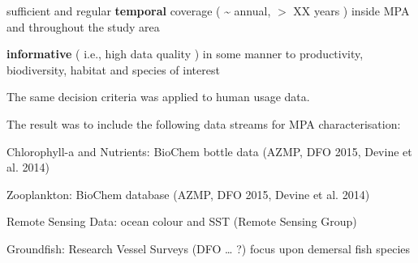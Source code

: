 \documentclass[letterpaper,portrait,12pt]{scrartcl}
\numberwithin{equation}{section}		%
\numberwithin{figure}{section}			%
\numberwithin{table}{section}				%
\begin{document}
\begin{flushleft}

	sufficient and regular \textbf{temporal} coverage ( \~{} annual, $>$ XX years ) inside MPA and throughout the study area

\end{flushleft}


\begin{flushleft}

	\textbf{informative} ( i.e., high data quality ) in some manner to productivity, biodiversity, habitat and species of interest

\end{flushleft}








The same decision criteria was applied to human usage data.









The result was to include the following data streams for MPA characterisation:








\begin{flushleft}

	Chlorophyll-a and Nutrients: BioChem bottle data (AZMP, DFO 2015, Devine et al. 2014) 

\end{flushleft}


\begin{flushleft}

	Zooplankton: BioChem database (AZMP, DFO 2015, Devine et al. 2014) 

\end{flushleft}


\begin{flushleft}

	Remote Sensing Data: ocean colour and SST (Remote Sensing Group)

\end{flushleft}


\begin{flushleft}

	Groundfish: Research Vessel Surveys (DFO \ldots{} ?)  focus upon demersal fish species

\end{flushleft}
\end{document}
